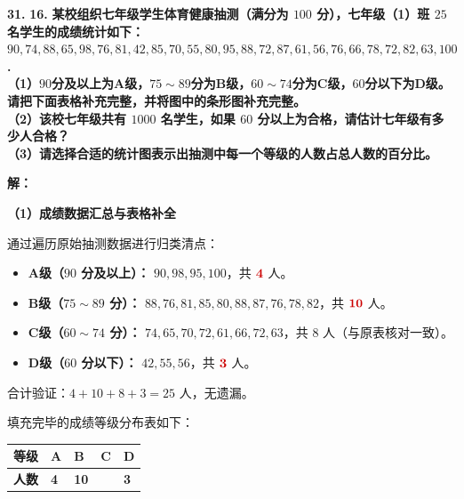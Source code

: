 \vspace{0.6cm}

\textbf{\LARGE 31.} \textbf{\color{cyan!80!blue} 16. }\textbf{某校组织七年级学生体育健康抽测（满分为 $100$ 分），七年级（1）班 $25$ 名学生的成绩统计如下：\\
$90, 74, 88, 65, 98, 76, 81, 42, 85, 70, 55, 80, 95, 88, 72, 87, 61, 56, 76, 66, 78, 72, 82, 63, 100$. \\[6pt]
（1）$90$分及以上为A级，$75\sim 89$分为B级，$60\sim 74$分为C级，$60$分以下为D级。请把下面表格补充完整，并将图中的条形图补充完整。\\
（2）该校七年级共有 $1000$ 名学生，如果 $60$ 分以上为合格，请估计七年级有多少人合格？\\
（3）请选择合适的统计图表示出抽测中每一个等级的人数占总人数的百分比。}

\vspace{0.4cm}
\textbf{解：}

\textbf{（1）成绩数据汇总与表格补全}

通过遍历原始抽测数据进行归类清点：
\begin{itemize}
    \item \textbf{A级（$90$ 分及以上）：} $90, 98, 95, 100$，共 $\textcolor{red!80!black}{\mathbf{4}}$ 人。
    \item \textbf{B级（$75\sim 89$ 分）：} $88, 76, 81, 85, 80, 88, 87, 76, 78, 82$，共 $\textcolor{red!80!black}{\mathbf{10}}$ 人。
    \item \textbf{C级（$60\sim 74$ 分）：} $74, 65, 70, 72, 61, 66, 72, 63$，共 \textbf{$8$} 人（与原表核对一致）。
    \item \textbf{D级（$60$ 分以下）：} $42, 55, 56$，共 $\textcolor{red!80!black}{\mathbf{3}}$ 人。
\end{itemize}
合计验证：$4 + 10 + 8 + 3 = 25$ 人，无遗漏。

填充完毕的成绩等级分布表如下：
\begin{center}
\renewcommand{\arraystretch}{1.8}
\setlength{\arrayrulewidth}{0.8pt}
\begin{tabular}{|>{\centering\arraybackslash}p{2cm}|>{\centering\arraybackslash}p{2cm}|>{\centering\arraybackslash}p{2cm}|>{\centering\arraybackslash}p{2cm}|>{\centering\arraybackslash}p{2cm}|}
\hline
\textbf{等级} & \textbf{A} & \textbf{B} & \textbf{C} & \textbf{D} \\
\hline
\textbf{人数} & \textcolor{red!80!black}{\textbf{4}} & \textcolor{red!80!black}{\textbf{10}} & 8 & \textcolor{red!80!black}{\textbf{3}} \\
\hline
\end{tabular}
\end{center}

